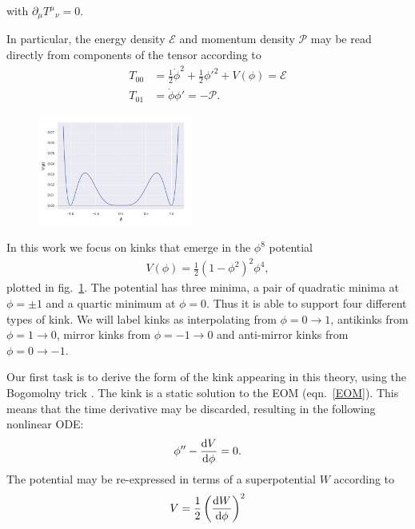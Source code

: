 \documentclass[11pt, oneside]{article}  	%
\numberwithin{equation}{section}
\newcommand{\drv}{\ensuremath{\textup{d}}}
\begin{document}
with $\partial_{\mu}{T^{\mu}}_{\nu} = 0$.\par
In particular, the energy density $\mathcal{E}$ and momentum density $\mathcal{P}$ may be read directly from components of the tensor according to
 \begin{align}
    T_{00} &= \frac{1}{2}\dot{\phi}^2 +  \frac{1}{2}{\phi'}^2   +V(\phi) = \mathcal{E} \label{energy}\\
    T_{01} &= \dot{\phi} \phi'  = -\mathcal{P}. \label{momentum}
\end{align}\par
\begin{figure}[t]
    \vspace{-10pt}
    \centering
    \includegraphics[width=0.45\textwidth]{phi8_potential.png}
     \label{phi8pot}
\end{figure}
In this work we focus on kinks that emerge in the $\phi^8$ potential
\begin{align}
    V(\phi) = \frac{1}{2} \left ( 1 - \phi^2\right)^2 \phi^4,
\end{align}
plotted in fig.~\ref{phi8pot}. The potential has three minima, a pair of quadratic minima at $\phi = \pm1$ and a quartic minimum at $\phi= 0$. Thus it is able to support four different types of kink. We will label kinks as interpolating from $\phi = 0 \rightarrow 1$, antikinks from $\phi = 1 \rightarrow 0$, mirror kinks from $\phi = -1 \rightarrow 0$ and anti-mirror kinks from $\phi = 0\rightarrow -1$.\par
Our first task is to derive the form of the kink appearing in this theory, using the Bogomolny trick \cite{bogomolny_stability_1976}. The kink is a static solution to the EOM (eqn.~\ref{EOM}). This means that the time derivative may be discarded, resulting in the following nonlinear ODE:
\begin{equation} \label{kink_equation}
    {\phi}'' - \frac{\drv V}{\drv \phi} = 0.
\end{equation}
The potential may be re-expressed in terms of a superpotential $W$ according to
\begin{equation}
    V = \frac{1}{2} \left ( \frac{\textup{d}W}{\textup{d}\phi}\right )^2
\end{equation}
\end{document}

